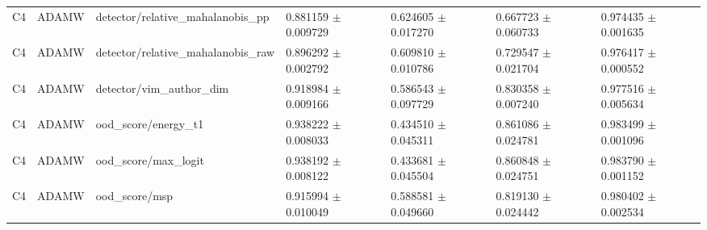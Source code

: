 \begin{longtable}{lllllll}
C4 & ADAMW & detector/relative\_mahalanobis\_pp & 0.881159 $\pm$ 0.009729 & 0.624605 $\pm$ 0.017270 & 0.667723 $\pm$ 0.060733 & 0.974435 $\pm$ 0.001635 \\
C4 & ADAMW & detector/relative\_mahalanobis\_raw & 0.896292 $\pm$ 0.002792 & 0.609810 $\pm$ 0.010786 & 0.729547 $\pm$ 0.021704 & 0.976417 $\pm$ 0.000552 \\
C4 & ADAMW & detector/vim\_author\_dim & 0.918984 $\pm$ 0.009166 & 0.586543 $\pm$ 0.097729 & 0.830358 $\pm$ 0.007240 & 0.977516 $\pm$ 0.005634 \\
C4 & ADAMW & ood\_score/energy\_t1 & 0.938222 $\pm$ 0.008033 & 0.434510 $\pm$ 0.045311 & 0.861086 $\pm$ 0.024781 & 0.983499 $\pm$ 0.001096 \\
C4 & ADAMW & ood\_score/max\_logit & 0.938192 $\pm$ 0.008122 & 0.433681 $\pm$ 0.045504 & 0.860848 $\pm$ 0.024751 & 0.983790 $\pm$ 0.001152 \\
C4 & ADAMW & ood\_score/msp & 0.915994 $\pm$ 0.010049 & 0.588581 $\pm$ 0.049660 & 0.819130 $\pm$ 0.024442 & 0.980402 $\pm$ 0.002534 \\
\end{longtable}
